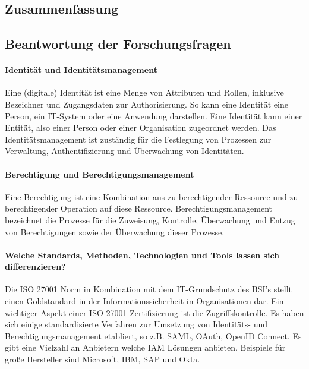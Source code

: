 \documentclass[12pt]{article}
\begin{document}
\subsection{Zusammenfassung}
\subsection{Beantwortung der Forschungsfragen}
\paragraph{Identität und Identitätsmanagement}
Eine (digitale) Identität ist eine Menge von Attributen und Rollen, inklusive Bezeichner und Zugangsdaten zur Authorisierung. So kann eine Identität eine Person, ein IT-System oder eine Anwendung darstellen. Eine Identität kann einer Entität, also einer Person oder einer Organisation zugeordnet werden. Das Identitätsmanagement ist zuständig für die Festlegung von Prozessen zur Verwaltung, Authentifizierung und Überwachung von Identitäten.
\paragraph{Berechtigung und Berechtigungsmanagement}
Eine Berechtigung ist eine Kombination aus zu berechtigender Ressource und zu berechtigender Operation auf diese Ressource. Berechtigungsmanagement bezeichnet die Prozesse für die Zuweisung, Kontrolle, Überwachung und Entzug von Berechtigungen sowie der Überwachung dieser Prozesse.
\paragraph{Welche Standards, Methoden, Technologien und Tools lassen sich differenzieren?}
Die ISO 27001 Norm in Kombination mit dem IT-Grundschutz des BSI's stellt einen Goldstandard in der Informationssicherheit in Organisationen dar. Ein wichtiger Aspekt einer ISO 27001 Zertifizierung ist die Zugriffskontrolle.  Es haben sich einige standardisierte Verfahren zur Umsetzung von Identitäts- und Berechtigungsmanagement etabliert, so z.B. SAML, OAuth, OpenID Connect. Es gibt eine Vielzahl an Anbietern welche IAM Lösungen anbieten. Beispiele für große Hersteller sind Microsoft, IBM, SAP und Okta.
\end{document}
